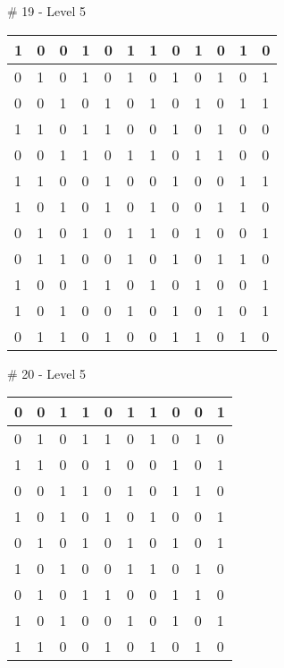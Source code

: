 \smallskip

\# 19 - Level 5 \newline
\begin{tabular}{|m{\collen}|m{\collen}|m{\collen}|m{\collen}|m{\collen}|m{\collen}|m{\collen}|m{\collen}|m{\collen}|m{\collen}|m{\collen}|m{\collen}|}
\hline
  1 & 0 & 0 & 1 & 0 & 1 & 1 & 0 & 1 & 0 & 1 & 0 \\
\hline
  0 & 1 & 0 & 1 & 0 & 1 & 0 & 1 & 0 & 1 & 0 & 1 \\
\hline
  0 & 0 & 1 & 0 & 1 & 0 & 1 & 0 & 1 & 0 & 1 & 1 \\
\hline
  1 & 1 & 0 & 1 & 1 & 0 & 0 & 1 & 0 & 1 & 0 & 0 \\
\hline
  0 & 0 & 1 & 1 & 0 & 1 & 1 & 0 & 1 & 1 & 0 & 0 \\
\hline
  1 & 1 & 0 & 0 & 1 & 0 & 0 & 1 & 0 & 0 & 1 & 1 \\
\hline
  1 & 0 & 1 & 0 & 1 & 0 & 1 & 0 & 0 & 1 & 1 & 0 \\
\hline
  0 & 1 & 0 & 1 & 0 & 1 & 1 & 0 & 1 & 0 & 0 & 1 \\
\hline
  0 & 1 & 1 & 0 & 0 & 1 & 0 & 1 & 0 & 1 & 1 & 0 \\
\hline
  1 & 0 & 0 & 1 & 1 & 0 & 1 & 0 & 1 & 0 & 0 & 1 \\
\hline
  1 & 0 & 1 & 0 & 0 & 1 & 0 & 1 & 0 & 1 & 0 & 1 \\
\hline
  0 & 1 & 1 & 0 & 1 & 0 & 0 & 1 & 1 & 0 & 1 & 0 \\
\hline
\end{tabular}


\smallskip

\# 20 - Level 5 \newline
\begin{tabular}{|m{\collen}|m{\collen}|m{\collen}|m{\collen}|m{\collen}|m{\collen}|m{\collen}|m{\collen}|m{\collen}|m{\collen}|}
\hline
  0 & 0 & 1 & 1 & 0 & 1 & 1 & 0 & 0 & 1 \\
\hline
  0 & 1 & 0 & 1 & 1 & 0 & 1 & 0 & 1 & 0 \\
\hline
  1 & 1 & 0 & 0 & 1 & 0 & 0 & 1 & 0 & 1 \\
\hline
  0 & 0 & 1 & 1 & 0 & 1 & 0 & 1 & 1 & 0 \\
\hline
  1 & 0 & 1 & 0 & 1 & 0 & 1 & 0 & 0 & 1 \\
\hline
  0 & 1 & 0 & 1 & 0 & 1 & 0 & 1 & 0 & 1 \\
\hline
  1 & 0 & 1 & 0 & 0 & 1 & 1 & 0 & 1 & 0 \\
\hline
  0 & 1 & 0 & 1 & 1 & 0 & 0 & 1 & 1 & 0 \\
\hline
  1 & 0 & 1 & 0 & 0 & 1 & 0 & 1 & 0 & 1 \\
\hline
  1 & 1 & 0 & 0 & 1 & 0 & 1 & 0 & 1 & 0 \\
\hline
\end{tabular}



